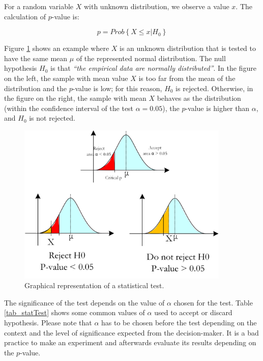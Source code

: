 For a random variable $X$ with unknown distribution, we observe a value $x$. The calculation of $p$-value is:

\begin{equation}
p=Prob\left\{ X\le x|H_0\right\}
\label{eq_pvalue}
\end{equation}

Figure \ref{fig_StatTest} shows an example where $X$ is an unknown distribution that is tested to have the same mean $\mu$ of the represented normal distribution. The null hypothesis $H_0$ is that \textit{“the empirical data are normally distributed”}. In the figure on the left, the sample with mean value $X$ is too far from the mean of the distribution and the $p$-value is low; for this reason, $H_0$ is rejected. Otherwise, in the figure on the right, the sample with mean $X$ behaves as the distribution (within the confidence interval of the test $\alpha=0.05$), the $p$-value is higher than $\alpha$, and $H_0$ is not rejected.

\begin{figure}[hbt!]
\centering
\includegraphics[width=0.9\textwidth]{SectionLetsMath/elemStat_figures/fig_StatTest.png}
\captionsetup{type=figure}
\caption{Graphical representation of a statistical test.}
\label{fig_StatTest}
\end{figure}

The significance of the test depends on the value of $\alpha$ chosen for the test. Table \ref{tab_statTest} shows some common values of $\alpha$ used to accept or discard hypothesis. Please note that $\alpha$ has to be chosen before the test depending on the context and the level of significance expected from the decision-maker. It is a bad practice to make an experiment and afterwards evaluate its results depending on the $p$-value.

